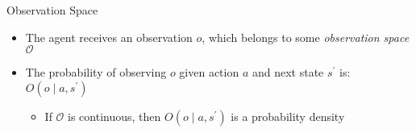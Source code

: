 \begin{frame}[fragile]{Observation Space}


\begin{itemize}
    \item The agent receives an observation $o$, which belongs to some \textit{observation space} $\mathcal{O}$
    \item The probability of observing $o$ given action $a$ and next state $s^\prime$ is: $O(o \mid a, s^\prime)$
    \begin{itemize}
        \item If $\mathcal{O}$ is continuous, then $O(o \mid a, s^\prime)$ is a probability density
    \end{itemize}

\end{itemize}


\end{frame}

